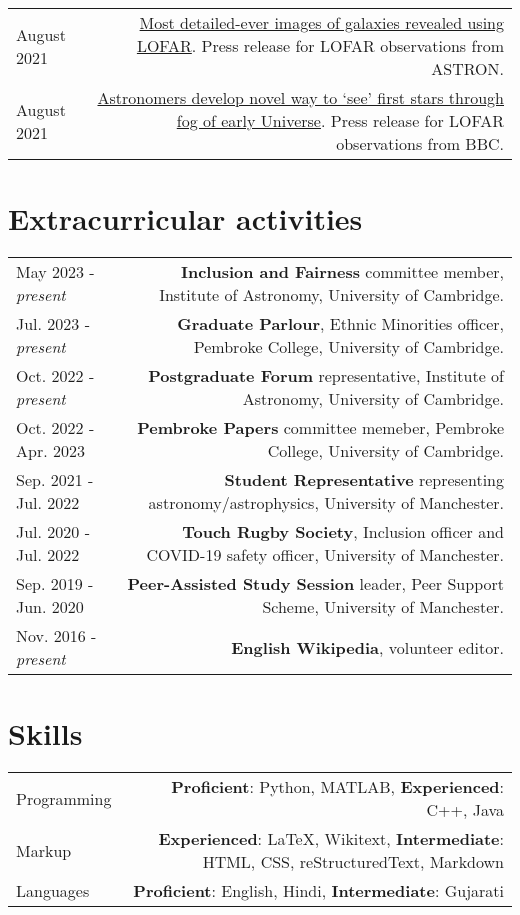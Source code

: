 \documentclass{article}
\begin{document}
\begin{tabular}{L!{\vrule}R}
	August 2021 & \href{https://www.astron.nl/most-detailed-ever-images-of-galaxies-revealed-using-lofar }{Most detailed-ever images of galaxies revealed using LOFAR}. Press release for LOFAR observations from ASTRON. \\
	August 2021 & \href{https://www.bbc.co.uk/news/science-environment-57998940}{Astronomers develop novel way to `see' first stars through fog of early Universe}. Press release for LOFAR observations from BBC. \\
\end{tabular}

\section*{Extracurricular activities}
\begin{tabular}{L!{\vrule}R}

  May 2023 - \textit{present} & \textbf{Inclusion and Fairness} committee member, Institute of Astronomy, University of Cambridge. \\

  Jul. 2023 - \textit{present} & \textbf{Graduate Parlour}, Ethnic Minorities officer, Pembroke College, University of Cambridge. \\

  Oct. 2022 - \textit{present} & \textbf{Postgraduate Forum} representative, Institute of Astronomy, University of Cambridge. \\

  Oct. 2022 - Apr. 2023 & \textbf{Pembroke Papers} committee memeber, Pembroke College, University of Cambridge. \\

  Sep. 2021 - Jul. 2022 & \textbf{Student Representative} representing astronomy/astrophysics, University of Manchester. \\

  Jul. 2020 - Jul. 2022 & \textbf{Touch Rugby Society}, Inclusion officer and COVID-19 safety officer, University of Manchester. \\

	Sep. 2019 - Jun. 2020 & \textbf{Peer-Assisted Study Session} leader, Peer Support Scheme, University of Manchester. \\

	Nov. 2016 - \textit{present} & \textbf{English Wikipedia}, volunteer editor. \\
\end{tabular}

\section*{Skills}

\begin{tabular}{L!{\vrule}R}
	Programming & \textbf{Proficient}: Python, MATLAB, \textbf{Experienced}: C++, Java\\
	Markup & \textbf{Experienced}: LaTeX, Wikitext, \textbf{Intermediate}:  HTML, CSS, reStructuredText, Markdown \\
	Languages & \textbf{Proficient}: English, Hindi, \textbf{Intermediate}: Gujarati
\end{tabular}
\end{document}
